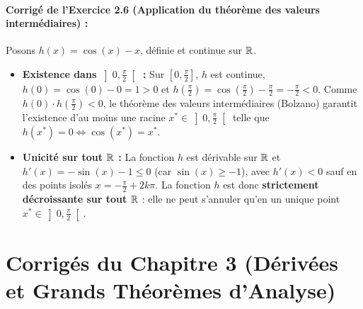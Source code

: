 \paragraph{Corrigé de l'Exercice 2.6 (Application du théorème des valeurs intermédiaires) :}
Posons $h(x) = \cos(x) - x$, définie et continue sur $\mathbb{R}$.
\begin{itemize}
    \item \textbf{Existence dans $\left]0, \frac{\pi}{2}\right[$ :} Sur $\left[0, \frac{\pi}{2}\right]$, $h$ est continue, $h(0) = \cos(0) - 0 = 1 > 0$ et $h\left(\frac{\pi}{2}\right) = \cos\left(\frac{\pi}{2}\right) - \frac{\pi}{2} = -\frac{\pi}{2} < 0$. Comme $h(0)\cdot h\left(\frac{\pi}{2}\right) < 0$, le théorème des valeurs intermédiaires (Bolzano) garantit l'existence d'au moins une racine $x^* \in \left]0, \frac{\pi}{2}\right[$ telle que $h(x^*) = 0 \iff \cos(x^*) = x^*$.
    \item \textbf{Unicité sur tout $\mathbb{R}$ :} La fonction $h$ est dérivable sur $\mathbb{R}$ et $h'(x) = -\sin(x) - 1 \le 0$ (car $\sin(x) \ge -1$), avec $h'(x) < 0$ sauf en des points isolés $x = -\frac{\pi}{2} + 2k\pi$. La fonction $h$ est donc \textbf{strictement décroissante sur tout $\mathbb{R}$} : elle ne peut s'annuler qu'en un unique point $x^* \in \left]0, \frac{\pi}{2}\right[$.
\end{itemize}

\section{Corrigés du Chapitre 3 (Dérivées et Grands Théorèmes d'Analyse)}

